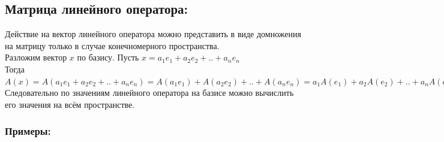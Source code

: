 \documentclass[12pt]{article}
\begin{document}
\subsection{Матрица линейного оператора:}
Действие на вектор линейного оператора можно представить в виде домножения на матрицу только в случае конечномерного пространства.\\
Разложим вектор $x$ по базису. Пусть $x=a_1 e_1+a_2 e_2+..+a_n e_n$\\
Тогда $A(x)=A(a_1 e_1+ a_2 e_2+..+a_n e_n)=A(a_1 e_1)+A(a_2 e_2)+..+A(a_n e_n)=a_1 A(e_1)+a_2 A(e_2)+..+a_n A(e_n)$\\
Следовательно по значениям линейного оператора на базисе можно вычислить его значения на всём пространстве.
\subsubsection{Примеры:}
\end{document}
